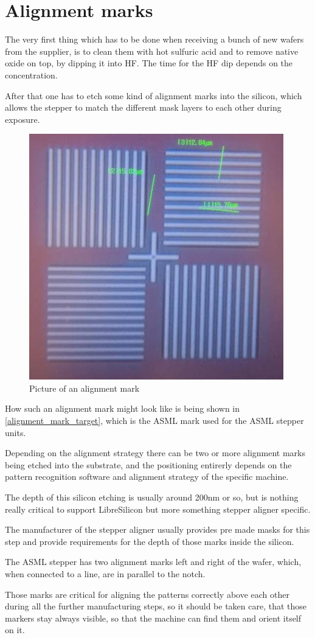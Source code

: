 \section{Alignment marks}\label{alignment_marks_chapter}

The very first thing which has to be done when receiving a bunch of new wafers from the supplier, is to clean them with hot sulfuric acid
and to remove native oxide on top, by dipping it into HF. The time for the HF dip depends on the concentration.

After that one has to etch some kind of alignment marks into the silicon, which allows the stepper to match the different mask layers
to each other during exposure.

\begin{figure}[H]
	\centering
	\includegraphics[scale=0.5]{pictures/alignment_cross.png}
	\caption{Picture of an alignment mark}
	\label{alignment_mark_target}
\end{figure}

How such an alignment mark might look like is being shown in \autoref{alignment_mark_target}, which is the ASML mark used for the ASML stepper units.

Depending on the alignment strategy there can be two or more alignment marks being etched into the substrate, and the positioning entirerly depends on
the pattern recognition software and alignment strategy of the specific machine.

The depth of this silicon etching is usually around 200nm or so, but is nothing really critical to support LibreSilicon but more something stepper
aligner specific.

The manufacturer of the stepper aligner usually provides pre made masks for this step and provide requirements for the depth of those marks inside the
silicon.

The ASML stepper has two alignment marks left and right of the wafer, which, when connected to a line, are in parallel to the notch.

Those marks are critical for aligning the patterns correctly above each other during all the further manufacturing steps, so it should be taken care,
that those markers stay always visible, so that the machine can find them and orient itself on it.
